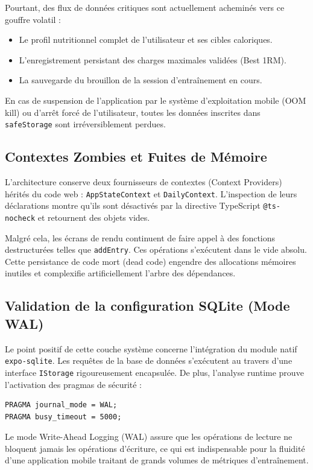 \documentclass[11pt, a4paper]{article}
\begin{document}
Pourtant, des flux de données critiques sont actuellement acheminés vers ce gouffre volatil :
\begin{itemize}
    \item Le profil nutritionnel complet de l'utilisateur et ses cibles caloriques.
    \item L'enregistrement persistant des charges maximales validées (Best 1RM).
    \item La sauvegarde du brouillon de la session d'entraînement en cours.
\end{itemize}
En cas de suspension de l'application par le système d'exploitation mobile (OOM kill) ou d'arrêt forcé de l'utilisateur, toutes les données inscrites dans \texttt{safeStorage} sont irréversiblement perdues.

\subsection{Contextes Zombies et Fuites de Mémoire}
L'architecture conserve deux fournisseurs de contextes (Context Providers) hérités du code web : \texttt{AppStateContext} et \texttt{DailyContext}.
L'inspection de leurs déclarations montre qu'ils sont désactivés par la directive TypeScript \texttt{@ts-nocheck} et retournent des objets vides.

Malgré cela, les écrans de rendu continuent de faire appel à des fonctions destructurées telles que \texttt{addEntry}. Ces opérations s'exécutent dans le vide absolu. Cette persistance de code mort (dead code) engendre des allocations mémoires inutiles et complexifie artificiellement l'arbre des dépendances.

\subsection{Validation de la configuration SQLite (Mode WAL)}
Le point positif de cette couche système concerne l'intégration du module natif \texttt{expo-sqlite}. Les requêtes de la base de données s'exécutent au travers d'une interface \texttt{IStorage} rigoureusement encapsulée.
De plus, l'analyse runtime prouve l'activation des pragmas de sécurité :
\begin{verbatim}
PRAGMA journal_mode = WAL;
PRAGMA busy_timeout = 5000;
\end{verbatim}
Le mode Write-Ahead Logging (WAL) assure que les opérations de lecture ne bloquent jamais les opérations d'écriture, ce qui est indispensable pour la fluidité d'une application mobile traitant de grands volumes de métriques d'entraînement.
\end{document}
